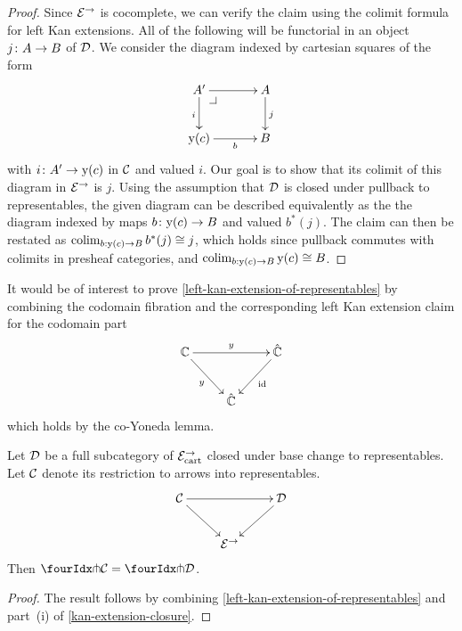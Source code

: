\documentclass[reqno,10pt,a4paper,oneside]{amsart}
\begin{document}
\begin{proof}
Since $\catE^{\to}$ is cocomplete, we can verify the claim using  the colimit formula for left Kan extensions.
All of the following will be functorial in an object $j \co A \to B$ of $\cal{D}$.
We consider the diagram indexed by cartesian squares of the form
\[
\xymatrix@C=1.2cm{
  A'
  \ar[r]
  \ar[d]_{i}
  \pullback{dr}
&
  A
  \ar[d]^{j}
\\
  \yon(c) 
  \ar[r]_-b 
&
  B
}
\]
with $i \co A' \to \yon(c)$ in $\cal{C}$ and valued $i$.
Our goal is to show that its colimit of this diagram in $\catE^{\to}$ is $j$.
Using the assumption that $\cal{D}$ is closed under pullback to representables, the given diagram
can be described equivalently as the the diagram indexed by maps $b \co \yon(c) \to B$ and valued $b^*(j)$. The claim can then be restated as  $\colim_{b : \yon(c) \to B} b^*(j) \iso j$, which 
holds since pullback commutes with colimits in presheaf categories, and  $\colim_{b : \yon(c) \to B} \yon(c) \iso B$.
\end{proof}


\begin{remark} It would be of interest to prove \cref{left-kan-extension-of-representables} by combining 
the codomain fibration and the corresponding left Kan extension claim for the codomain part
\[
\xymatrix{
  \cat{C}
  \ar[rr]^{y}
  \ar[dr]_{y}
&&
  \hat{\catC}
  \ar[dl]^{\id}
\\&
  \hat{\cat{C}}
}
\]
which holds by the co-Yoneda lemma.
\end{remark}



\begin{lemma}
\label{awfs-on-arrows-into-representables}
Let $\cal{D}$ be a full subcategory of $\catE_{\cart}^{\to}$ closed under base change to representables.
Let $\cal{C}$ denote its restriction to arrows into representables.
\[
\xymatrix{
  \cal{C}
  \ar[rr]
  \ar[dr]
&&
  \cal{D}
  \ar[dl]
\\&
  \catE^{\to}
}
\]
Then $\liftr{\cal{C}} = \liftr{\cal{D}}$.
\end{lemma}

\begin{proof} The result follows by combining \cref{left-kan-extension-of-representables} and part~(i) of \cref{kan-extension-closure}. 
\end{proof}
\end{document}
